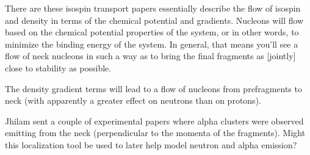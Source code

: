 There are these isospin transport papers essentially describe the flow of isospin and density in terms of the chemical potential and gradients. Nucleons will flow based on the chemical potential properties of the system, or in other words, to minimize the binding energy of the system. In general, that means you'll see a flow of neck nucleons in such a way as to bring the final fragments as [jointly] close to stability as possible.

The density gradient terms will lead to a flow of nucleons from prefragments to neck (with apparently a greater effect on neutrons than on protons).

Jhilam sent a couple of experimental papers where alpha clusters were observed emitting from the neck (perpendicular to the momenta of the fragments). Might this localization tool be used to later help model neutron and alpha emission?